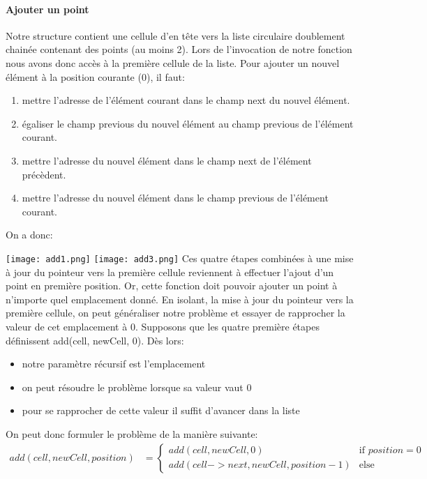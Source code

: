 \documentclass[a4paper, 11pt, oneside]{article}
\begin{document}
\paragraph{Ajouter un point}
Notre structure contient une cellule d'en tête vers la liste circulaire doublement chainée contenant des points (au moins 2). Lors de l'invocation de notre fonction nous avons donc accès à la première cellule de la liste. Pour ajouter un nouvel élément à la position courante (0), il faut:
\begin{enumerate}
    \item mettre l'adresse de l'élément courant dans le champ next du nouvel élément.
    \item égaliser le champ previous du nouvel élément au champ previous de l'élément courant.
    \item mettre l'adresse du nouvel élément dans le champ next de l'élément précèdent.
    \item mettre l'adresse du nouvel élément dans le champ previous de l'élément courant.
\end{enumerate}
On a donc:

\texttt{[image: add1.png]}
\texttt{[image: add3.png]}
Ces quatre étapes combinées à une mise à jour du pointeur vers la première cellule reviennent à effectuer l'ajout d'un point en première position. Or, cette fonction doit pouvoir ajouter un point à n'importe quel emplacement donné. En isolant, la mise à jour du pointeur vers la première cellule, on peut généraliser notre problème et essayer de rapprocher la valeur de cet emplacement à 0. Supposons que les quatre première étapes définissent add(cell, newCell, 0). Dès lors:
\begin{itemize}
    \item notre paramètre récursif est l'emplacement
    \item on peut résoudre le problème lorsque sa valeur vaut 0
    \item pour se rapprocher de cette valeur il suffit d'avancer dans la liste
\end{itemize}
On peut donc formuler le problème de la manière suivante:\\
$
\begin{array}{ll}
add(cell, newCell, position) 
&=\left\{
    \begin{array}{ll}
        add(cell, newCell, 0) & \mbox{if } position = 0 \\
        add(cell->next, newCell, position - 1) & \mbox{else}
    \end{array}
\right.
\end{array}$ 
\end{document}

